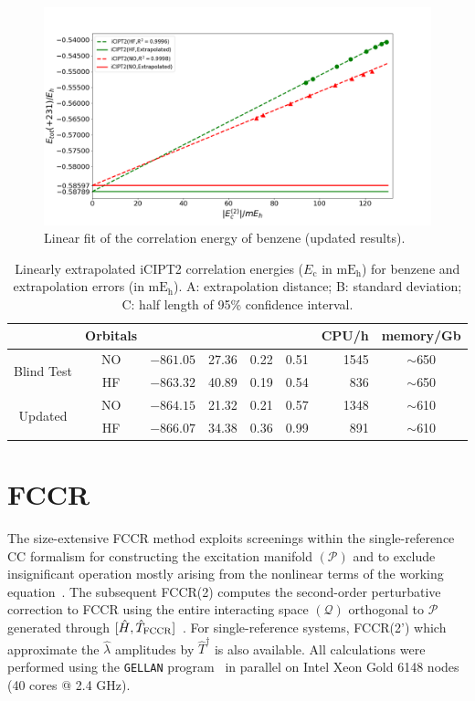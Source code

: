 \documentclass[journal=jcp,manuscript=suppinfo]{achemso}
\begin{document}
\begin{figure}[!htp]
	\centering
	\includegraphics[width=\textwidth]{figures/ici/benzene_ici_updated.png}
	\caption{Linear fit of the correlation energy of benzene (updated results).}\label{BenzeneEnNew}
\end{figure}

\begin{table}[!htp]
	\centering
	\caption{Linearly extrapolated iCIPT2 correlation energies ($E_{\mathrm{c}}$ in $\mathrm{mE_h}$) for benzene and
extrapolation errors (in $\mathrm{mE_h}$). A: extrapolation distance; B: standard deviation; C:
half length of 95\% confidence interval.}
	\begin{tabular}{ccccccrc}\toprule
		&Orbitals
		&\makecell{$E_{\mathrm{c}}$}
		&\makecell{A}
		&\makecell{B}
		&\makecell{C}
		&CPU/h&memory/Gb
		\\\toprule
		\multirow{2}{*}{Blind Test}
		&NO&$-861.05$&27.36&0.22&0.51&1545&$\sim$650\\
		&HF&$-863.32$&40.89&0.19&0.54&836&$\sim$650\\\midrule
		\multirow{2}{*}{Updated}
		&NO&$-864.15$&21.32&0.21&0.57&1348&$\sim$610\\
		&HF&$-866.07$&34.38&0.36&0.99&891&$\sim$610\\\bottomrule
	\end{tabular}
\label{iCIsum}
\end{table}

\section{FCCR}

The size-extensive FCCR method exploits screenings within the single-reference CC formalism for constructing the excitation manifold $({\mathcal P})$ and to exclude insignificant operation mostly arising from the nonlinear terms of the working equation~\cite{ten_no_fcc_prl_2018}. The subsequent FCCR(2) computes the second-order perturbative correction to FCCR using the entire interacting space $({\mathcal Q})$ orthogonal to ${\mathcal P}$ generated through $[\hat H, \hat T_{\rm FCCR}]$~\cite{ten_no_fccr_2020}. For single-reference systems, FCCR(2') which approximate the $\hat \lambda$ amplitudes by $\hat T^{\dagger}$ is also available. All calculations were performed using the \texttt{GELLAN} program~\cite{gellan} in parallel on Intel Xeon Gold 6148 nodes (40 cores @ 2.4 GHz).\\
\end{document}
